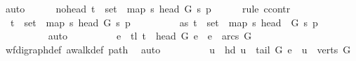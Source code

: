 \begin{isabellebody}
\ auto\isanewline
\ \ \ \ \isamarkupfalse%
\ no{\isacharunderscore}{\kern0pt}head{\isacharcolon}{\kern0pt}\ {\isachardoublequoteopen}t\ {\isasymnotin}\ {\isacharparenleft}{\kern0pt}set\ {\isacharparenleft}{\kern0pt}\ map\ {\isacharparenleft}{\kern0pt}{\isasymlambda}s{\isachardot}{\kern0pt}\ {\isacharparenleft}{\kern0pt}head\ G\ s{\isacharparenright}{\kern0pt}{\isacharparenright}{\kern0pt}\ p{\isacharparenright}{\kern0pt}{\isacharparenright}{\kern0pt}{\isachardoublequoteclose}\isanewline
\ \ \ \ \isamarkupfalse%
\ {\isacharparenleft}{\kern0pt}rule\ ccontr{\isacharparenright}{\kern0pt}\isanewline
\ \ \ \ \ \ \isamarkupfalse%
\ {\isachardoublequoteopen}{\isasymnot}\ t\ {\isasymnotin}\ {\isacharparenleft}{\kern0pt}set\ {\isacharparenleft}{\kern0pt}\ map\ {\isacharparenleft}{\kern0pt}{\isasymlambda}s{\isachardot}{\kern0pt}\ {\isacharparenleft}{\kern0pt}head\ G\ s{\isacharparenright}{\kern0pt}{\isacharparenright}{\kern0pt}\ p{\isacharparenright}{\kern0pt}{\isacharparenright}{\kern0pt}{\isachardoublequoteclose}\isanewline
\ \ \ \ \ \ \isamarkupfalse%
\ \isamarkupfalse%
\ as{\isacharcolon}{\kern0pt}\ {\isachardoublequoteopen}t\ {\isasymin}\ {\isacharparenleft}{\kern0pt}set\ {\isacharparenleft}{\kern0pt}\ map\ {\isacharparenleft}{\kern0pt}{\isasymlambda}s{\isachardot}{\kern0pt}\ {\isacharparenleft}{\kern0pt}head\ \ G\ s{\isacharparenright}{\kern0pt}{\isacharparenright}{\kern0pt}\ p{\isacharparenright}{\kern0pt}{\isacharparenright}{\kern0pt}{\isachardoublequoteclose}\isanewline
\ \ \ \ \ \ \ \ \isamarkupfalse%
\ auto\isanewline
\ \ \ \ \ \ \isamarkupfalse%
\ \isamarkupfalse%
\ e\ \ tl{\isacharcolon}{\kern0pt}\ {\isachardoublequoteopen}t\ {\isacharequal}{\kern0pt}\ {\isacharparenleft}{\kern0pt}head\ G\ e{\isacharparenright}{\kern0pt}\ {\isasymand}\ e\ {\isasymin}\ arcs\ G{\isachardoublequoteclose}\isanewline
\ \ \ \ \ \ \ \ \isamarkupfalse%
\ wf{\isacharunderscore}{\kern0pt}digraph{\isacharunderscore}{\kern0pt}def\ awalk{\isacharunderscore}{\kern0pt}def\ path\ \isamarkupfalse%
\ auto\isanewline
\ \ \ \ \ \ \isamarkupfalse%
\ \isamarkupfalse%
\ u\ \ hd{\isacharcolon}{\kern0pt}\ {\isachardoublequoteopen}u\ {\isacharequal}{\kern0pt}\ {\isacharparenleft}{\kern0pt}tail\ G\ e{\isacharparenright}{\kern0pt}\ {\isasymand}\ u\ {\isasymin}\ verts\ G{\isachardoublequoteclose}\isanewline
\ \ \ \ \ \ \ \ \isamarkupfalse%

\end{isabellebody}
